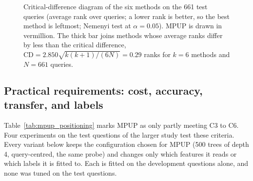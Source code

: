 \documentclass[conference]{IEEEtran}
\begin{document}
\begin{figure}[htbp]
    \centering
    \resizebox{\columnwidth}{!}{}
    \caption{Critical-difference diagram of the six methods on the 661 test queries (average rank over queries; a lower rank is better, so the best method is leftmost; Nemenyi test at $\alpha = 0.05$). MPUP is drawn in vermillion. The thick bar joins methods whose average ranks differ by less than the critical difference, $\mathrm{CD} = 2.850\sqrt{k(k+1)/(6N)} = 0.29$ ranks for $k = 6$ methods and $N = 661$ queries.}
    \label{fig:cd}
\end{figure}

\subsection{Practical requirements: cost, accuracy, transfer, and labels}\label{sec:criteria}
Table~\ref{tab:mpup_positioning} marks MPUP as only partly meeting C3 to C6. Four experiments on the test questions of the larger study test these criteria. Every variant below keeps the configuration chosen for MPUP (500 trees of depth 4, query-centred, the same probe) and changes only which features it reads or which labels it is fitted to. Each is fitted on the development questions alone, and none was tuned on the test questions.
\end{document}
